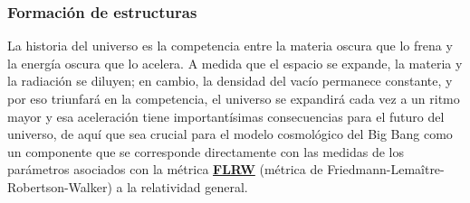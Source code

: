 

\subsubsection{Formación de estructuras}


La historia del universo es la competencia entre la materia oscura que lo frena y la energía oscura que lo acelera. A medida que el espacio se expande, la materia y la radiación se diluyen; en cambio, la densidad del vacío permanece constante, y por eso triunfará en la competencia, el universo se expandirá cada vez a un ritmo mayor y esa aceleración tiene importantísimas consecuencias para el futuro del universo, de aquí que sea crucial para el modelo cosmológico del Big Bang como un componente que se corresponde directamente con las medidas de los parámetros asociados con la métrica \href{https://es.wikipedia.org/wiki/M\%C3\%A9trica_de_Friedman-Lema\%C3\%AEtre-Robertson-Walker}{\textbf{FLRW}} (métrica de Friedmann-Lemaître-Robertson-Walker) a la relatividad general. 

